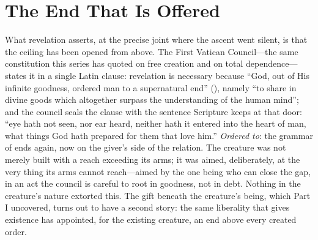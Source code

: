 \section{The End That Is Offered}

What revelation asserts, at the precise joint where the ascent went silent, is that the ceiling has been opened from above. The First Vatican Council---the same constitution this series has quoted on free creation and on total dependence---states it in a single Latin clause: revelation is necessary because ``God, out of His infinite goodness, ordered man to a supernatural end'' (), namely ``to share in divine goods which altogether surpass the understanding of the human mind''; and the council seals the clause with the sentence Scripture keeps at that door: ``eye hath not seen, nor ear heard, neither hath it entered into the heart of man, what things God hath prepared for them that love him.'' \emph{Ordered to}: the grammar of ends again, now on the giver's side of the relation. The creature was not merely built with a reach exceeding its arms; it was aimed, deliberately, at the very thing its arms cannot reach---aimed by the one being who can close the gap, in an act the council is careful to root in goodness, not in debt. Nothing in the creature's nature extorted this. The gift beneath the creature's being, which Part I uncovered, turns out to have a second story: the same liberality that gives existence has appointed, for the existing creature, an end above every created order.

